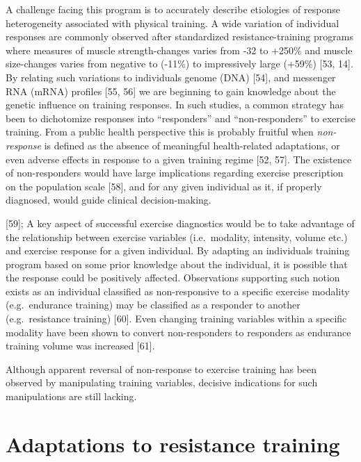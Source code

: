 \documentclass[twoside,10pt]{gihclass} %
\begin{document}
A challenge facing this program is to accurately describe etiologies of response heterogeneity associated with physical training. A wide variation of individual responses are commonly observed after standardized resistance-training programs where measures of muscle strength-changes varies from -32 to +250\% and muscle size-changes varies from negative to (-11\%) to impressively large (+59\%)
{[}53, 14{]}.
By relating such variations to individuals genome (DNA)
{[}54{]},
and messenger RNA (mRNA) profiles
{[}55, 56{]}
we are beginning to gain knowledge about the genetic influence on training responses.
In such studies, a common strategy has been to dichotomize responses into ``responders'' and ``non-responders'' to exercise training. From a public health perspective this is probably fruitful when \emph{non-response} is defined as the absence of meaningful health-related adaptations, or even adverse effects in response to a given training regime
{[}52, 57{]}.
The existence of non-responders would have large implications regarding exercise prescription on the population scale
{[}58{]},
and for any given individual as it, if properly diagnosed, would guide clinical decision-making.

{[}59{]};
A key aspect of successful exercise diagnostics would be to take advantage of the relationship between exercise variables (i.e.~modality, intensity, volume etc.) and exercise response for a given individual.
By adapting an individuals training program based on some prior knowledge about the individual, it is possible that the response could be positively affected.
Observations supporting such notion exists as an individual classified as non-responsive to a specific exercise modality (e.g.~endurance training) may be classified as a responder to another (e.g.~resistance training)
{[}60{]}.
Even changing training variables within a specific modality have been shown to convert non-responders to responders as endurance training volume was increased
{[}61{]}.

Although apparent reversal of non-response to exercise training has been observed by manipulating training variables, decisive indications for such manipulations are still lacking.

\hypertarget{adaptations-to-resistance-training}{%
\section{Adaptations to resistance training}\label{adaptations-to-resistance-training}}
\end{document}
